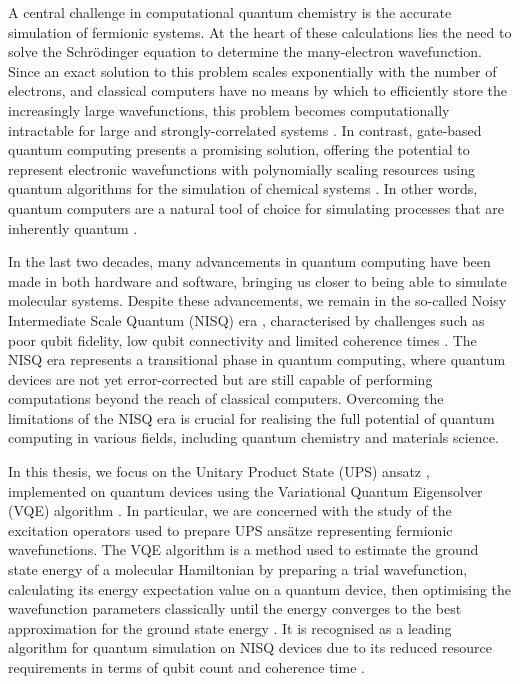 A central challenge in computational quantum chemistry is the accurate simulation of fermionic systems. At the heart of these calculations lies the need to solve the Schrödinger equation to determine the many-electron wavefunction. Since an exact solution to this problem scales exponentially with the number of electrons, and classical computers have no means by which to efficiently store the increasingly large wavefunctions, this problem becomes computationally intractable for large and strongly-correlated systems \cite{Szalay2011}. In contrast, gate-based quantum computing presents a promising solution, offering the potential to represent electronic wavefunctions with polynomially scaling resources using quantum algorithms for the simulation of chemical systems \cite{Kassal2011}. In other words, quantum computers are a natural tool of choice for simulating processes that are inherently quantum \cite{Yeung2020}.

In the last two decades, many advancements in quantum computing have been made in both hardware and software, bringing us closer to being able to simulate molecular systems. Despite these advancements, we remain in the so-called Noisy Intermediate Scale Quantum (NISQ) era \cite{Preskill2018}, characterised by challenges such as poor qubit fidelity, low qubit connectivity and limited coherence times \cite{Poulin2014}. The NISQ era represents a transitional phase in quantum computing, where quantum devices are not yet error-corrected but are still capable of performing computations beyond the reach of classical computers. Overcoming the limitations of the NISQ era is crucial for realising the full potential of quantum computing in various fields, including quantum chemistry and materials science.


In this thesis, we focus on the Unitary Product State (UPS) ansatz \cite{Burton2023}, implemented on quantum devices using the Variational Quantum Eigensolver (VQE) algorithm \cite{Wecker2015}. In particular, we are concerned with the study of the excitation operators used to prepare UPS ansätze representing fermionic wavefunctions. The VQE algorithm is a method used to estimate the ground state energy of a molecular Hamiltonian by preparing a trial wavefunction, calculating its energy expectation value on a quantum device, then optimising the wavefunction parameters classically until the energy converges to the best approximation for the ground state energy \cite{McClean2016}. It is recognised as a leading algorithm for quantum simulation on NISQ devices due to its reduced resource requirements in terms of qubit count and coherence time \cite{Kirby2020}.


